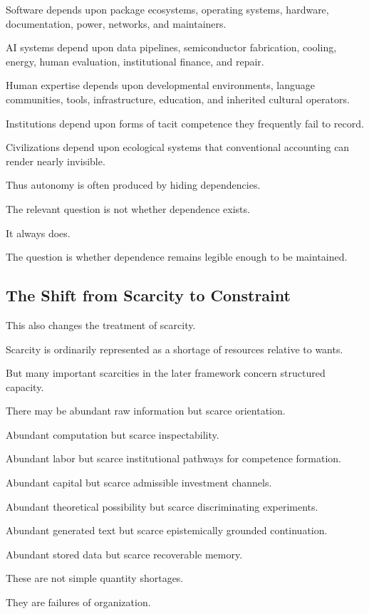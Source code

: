 \documentclass[11pt]{article}
\theoremstyle{remark}
\begin{document}
Software depends upon package ecosystems, operating systems, hardware,
documentation, power, networks, and maintainers.

AI systems depend upon data pipelines, semiconductor fabrication, cooling,
energy, human evaluation, institutional finance, and repair.

Human expertise depends upon developmental environments, language communities,
tools, infrastructure, education, and inherited cultural operators.

Institutions depend upon forms of tacit competence they frequently fail to
record.

Civilizations depend upon ecological systems that conventional accounting can
render nearly invisible.

Thus autonomy is often produced by hiding dependencies.

The relevant question is not whether dependence exists.

It always does.

The question is whether dependence remains legible enough to be maintained.

\subsection{The Shift from Scarcity to Constraint}

This also changes the treatment of scarcity.

Scarcity is ordinarily represented as a shortage of resources relative to
wants.

But many important scarcities in the later framework concern structured
capacity.

There may be abundant raw information but scarce orientation.

Abundant computation but scarce inspectability.

Abundant labor but scarce institutional pathways for competence formation.

Abundant capital but scarce admissible investment channels.

Abundant theoretical possibility but scarce discriminating experiments.

Abundant generated text but scarce epistemically grounded continuation.

Abundant stored data but scarce recoverable memory.

These are not simple quantity shortages.

They are failures of organization.
\end{document}
